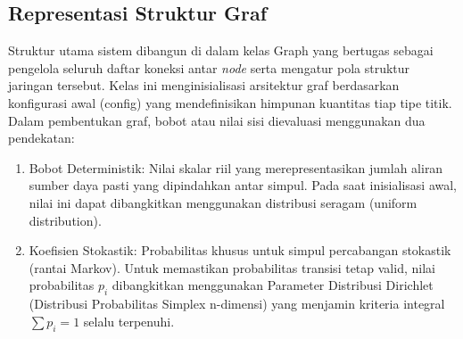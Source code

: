 \subsection{Representasi Struktur Graf}
Struktur utama sistem dibangun di dalam kelas Graph yang bertugas sebagai pengelola seluruh daftar koneksi antar \textit{node} serta mengatur pola struktur jaringan tersebut. Kelas ini menginisialisasi arsitektur graf berdasarkan konfigurasi awal (config) yang mendefinisikan himpunan kuantitas tiap tipe titik. Dalam pembentukan graf, bobot atau nilai sisi dievaluasi menggunakan dua pendekatan:
\begin{enumerate}
    \item Bobot Deterministik: Nilai skalar riil yang merepresentasikan jumlah aliran sumber daya pasti yang dipindahkan antar simpul. Pada saat inisialisasi awal, nilai ini dapat dibangkitkan menggunakan distribusi seragam (uniform distribution).
    \item Koefisien Stokastik: Probabilitas khusus untuk simpul percabangan stokastik (rantai Markov). Untuk memastikan probabilitas transisi tetap valid, nilai probabilitas $p_i$ dibangkitkan menggunakan Parameter Distribusi Dirichlet (Distribusi Probabilitas Simplex n-dimensi) yang menjamin kriteria integral $\sum p_i = 1$ selalu terpenuhi.

\begin{figure}[htbp]
\end{figure}
\end{enumerate}
